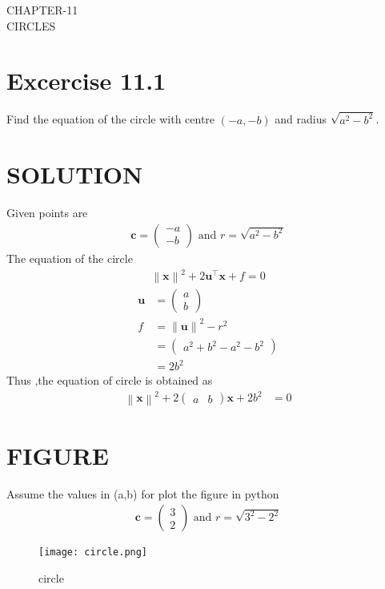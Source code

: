 \documentclass[12pt]{article}
\providecommand{\norm}[1]{\left\lVert#1\right\rVert}
\newcommand{\myvec}[1]{\ensuremath{\begin{pmatrix}#1\end{pmatrix}}}
\let\vec\mathbf
\begin{document}
\begin{center}
\textbf\large{CHAPTER-11 \\ CIRCLES}

\end{center}
\section{Excercise 11.1}
Find the equation of the circle with centre $(-a,-b)$ and radius $\sqrt{a^2-b^2}$.

\section{SOLUTION}
Given points are
\begin{align}
	\vec{c} = \myvec{-a\\-b} \text{ and } r = \sqrt{a^2-b^2}
\end{align}
The equation of the circle 
\begin{align}
	\norm{\vec{x}}^{2} + 2\vec{u}^{\top}\vec{x} + f = 0
\end{align}
\begin{align}
	\vec{u} &= \myvec{a\\b}\\
	f &= \norm{\vec{u}}^2 - r^2\\
	  &= \myvec{a^2+b^2-a^2-b^2}\\
	  &=2b^2
\end{align}
Thus ,the equation of circle is obtained as
\begin{align}
	\norm{\vec{x}}^2 +2 \myvec{a&b}\vec{x}+2b^2 &= 0       		       
\end{align}	
\section{FIGURE}
Assume the values in (a,b) for plot the figure in python
\begin{align}
\vec{c}=\myvec{3\\2} \text{ and } r=\sqrt{3^2-2^2}
\end{align} 
\begin{figure}[h]
\centering
\texttt{[image: circle.png]}
\caption{circle}
		\label{fig:Figure}
\end{figure}
   
\end{document}
